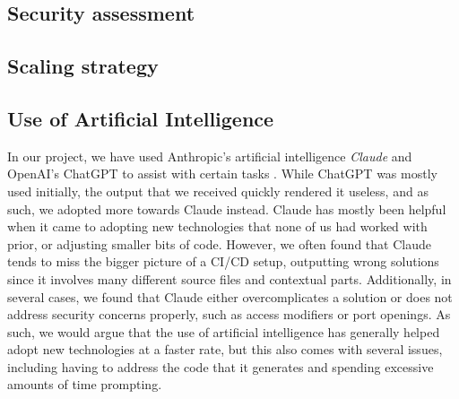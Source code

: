 \subsection{Security assessment} %

\subsection{Scaling strategy} %

\subsection{Use of Artificial Intelligence} %
In our project, we have used Anthropic’s artificial intelligence \textit{Claude} and OpenAI’s ChatGPT to assist with certain tasks \parencite{chat,claude}. While ChatGPT was mostly used initially, the output that we received quickly rendered it useless, and as such, we adopted more towards Claude instead. Claude has mostly been helpful when it came to adopting new technologies that none of us had worked with prior, or adjusting smaller bits of code. However, we often found that Claude tends to miss the bigger picture of a CI/CD setup, outputting wrong solutions since it involves many different source files and contextual parts. Additionally, in several cases, we found that Claude either overcomplicates a solution or does not address security concerns properly, such as access modifiers or port openings. As such, we would argue that the use of artificial intelligence has generally helped adopt new technologies at a faster rate, but this also comes with several issues, including having to address the code that it generates and spending excessive amounts of time prompting. 